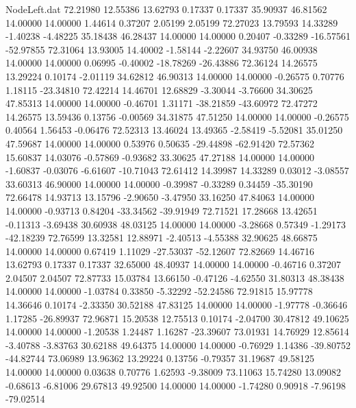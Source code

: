 \begin{filecontents}{NodeLeft.dat}
  72.21980   12.55386   13.62793     0.17337    0.17337   35.90937   46.81562   14.00000   14.00000    1.44614    0.37207    2.05199    2.05199
  72.27023   13.79593   14.33289    -1.40238   -4.48225   35.18438   46.28437   14.00000   14.00000    0.20407   -0.33289  -16.57561  -52.97855
  72.31064   13.93005   14.40002    -1.58144   -2.22607   34.93750   46.00938   14.00000   14.00000    0.06995   -0.40002  -18.78269  -26.43886
  72.36124   14.26575   13.29224     0.10174   -2.01119   34.62812   46.90313   14.00000   14.00000   -0.26575    0.70776    1.18115  -23.34810
  72.42214   14.46701   12.68829    -3.30044   -3.76600   34.30625   47.85313   14.00000   14.00000   -0.46701    1.31171  -38.21859  -43.60972
  72.47272   14.26575   13.59436     0.13756   -0.00569   34.31875   47.51250   14.00000   14.00000   -0.26575    0.40564    1.56453   -0.06476
  72.52313   13.46024   13.49365    -2.58419   -5.52081   35.01250   47.59687   14.00000   14.00000    0.53976    0.50635  -29.44898  -62.91420
  72.57362   15.60837   14.03076    -0.57869   -0.93682   33.30625   47.27188   14.00000   14.00000   -1.60837   -0.03076   -6.61607  -10.71043
  72.61412   14.39987   14.33289     0.03012   -3.08557   33.60313   46.90000   14.00000   14.00000   -0.39987   -0.33289    0.34459  -35.30190
  72.66478   14.93713   13.15796    -2.90650   -3.47950   33.16250   47.84063   14.00000   14.00000   -0.93713    0.84204  -33.34562  -39.91949
  72.71521   17.28668   13.42651    -0.11313   -3.69438   30.60938   48.03125   14.00000   14.00000   -3.28668    0.57349   -1.29173  -42.18239
  72.76599   13.32581   12.88971    -2.40513   -4.55388   32.90625   48.66875   14.00000   14.00000    0.67419    1.11029  -27.53037  -52.12607
  72.82669   14.46716   13.62793     0.17337    0.17337   32.65000   48.40937   14.00000   14.00000   -0.46716    0.37207    2.04507    2.04507
  72.87733   15.03784   13.66150    -0.47126   -4.62550   31.80313   48.38438   14.00000   14.00000   -1.03784    0.33850   -5.32292  -52.24586
  72.91815   15.97778   14.36646     0.10174   -2.33350   30.52188   47.83125   14.00000   14.00000   -1.97778   -0.36646    1.17285  -26.89937
  72.96871   15.20538   12.75513     0.10174   -2.04700   30.47812   49.10625   14.00000   14.00000   -1.20538    1.24487    1.16287  -23.39607
  73.01931   14.76929   12.85614    -3.40788   -3.83763   30.62188   49.64375   14.00000   14.00000   -0.76929    1.14386  -39.80752  -44.82744
  73.06989   13.96362   13.29224     0.13756   -0.79357   31.19687   49.58125   14.00000   14.00000    0.03638    0.70776    1.62593   -9.38009
  73.11063   15.74280   13.09082    -0.68613   -6.81006   29.67813   49.92500   14.00000   14.00000   -1.74280    0.90918   -7.96198  -79.02514

\end{filecontents}
